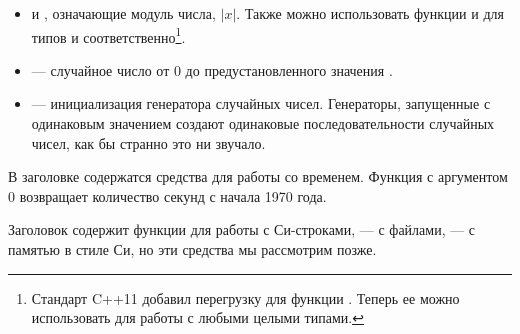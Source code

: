 \documentclass[book.tex]{subfiles}
\begin{document}
\begin{itemize}

\item {} и , означающие модуль числа, $|x|$. Также можно использовать функции  и  для типов  и  соответственно\footnote{Стандарт C++11 добавил перегрузку для функции . Теперь ее можно использовать для работы с любыми целыми типами.}.

\item {} --- случайное число от 0 до предустановленного значения .

\item {} --- инициализация генератора случайных чисел. Генераторы, запущенные с одинаковым значением  создают одинаковые последовательности случайных чисел, как бы странно это ни звучало.

\end{itemize}

В заголовке  содержатся средства для работы со временем. Функция  с аргументом 0 возвращает количество секунд с начала 1970 года.


Заголовок  содержит функции для работы с Си-строками,  --- с файлами,  --- с памятью в стиле Си, но эти средства мы рассмотрим позже.
\end{document}
